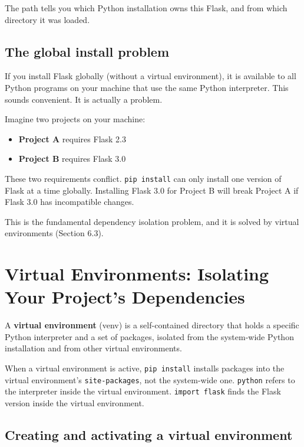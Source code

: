 \noindent{}The path tells you which Python installation owns this Flask, and from which directory it was loaded.

\subsection*{The global install problem}\label{06-local-dependencies:the-global-install-problem}

If you install Flask globally (without a virtual environment), it is available to all Python programs on your machine that use the same Python interpreter. This sounds convenient. It is actually a problem.

Imagine two projects on your machine:

\begin{itemize}
\tightlist
\item
  \textbf{Project A} requires Flask 2.3
\item
  \textbf{Project B} requires Flask 3.0
\end{itemize}

\noindent{}These two requirements conflict. \texttt{pip\ install} can only install one version of Flask at a time globally. Installing Flask 3.0 for Project B will break Project A if Flask 3.0 has incompatible changes.

This is the fundamental dependency isolation problem, and it is solved by virtual environments (Section 6.3).

\setcounter{section}{2}
\section{Virtual Environments: Isolating Your Project's Dependencies}\label{06-local-dependencies:63-virtual-environments-isolating-your-projects-dependencies}

A \textbf{virtual environment} (venv) is a self-contained directory that holds a specific Python interpreter and a set of packages, isolated from the system-wide Python installation and from other virtual environments.

When a virtual environment is active, \texttt{pip\ install} installs packages into the virtual environment's \texttt{site-packages}, not the system-wide one. \texttt{python} refers to the interpreter inside the virtual environment. \texttt{import\ flask} finds the Flask version inside the virtual environment.

\subsection*{Creating and activating a virtual environment}\label{06-local-dependencies:creating-and-activating-a-virtual-environment}

